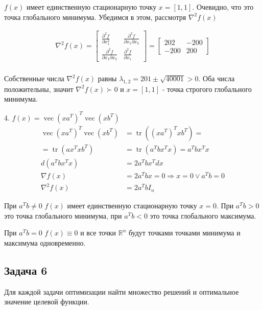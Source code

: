 \documentclass{article}
\DeclareMathOperator{\tr}{tr}
\DeclareMathOperator{\vect}{vec}
\newcommand{\RV}[1] {\mathbb{R}^{#1}}
\begin{document}
    $f(x)$ имеет единственную стационарную точку $x = [1, 1]$. Очевидно, что это точка глобального минимума. Убедимся в этом, рассмотря $\nabla^2 f(x)$
    
    \begin{align*}
        \nabla^2 f(x) = 
                \left[
                \begin{matrix} 
                    \frac{\partial^2 f}{\partial x_1^2} &
                    \frac{\partial^2 f}{\partial x_1 \partial x_2}\\                    
                    \frac{\partial^2 f}{\partial x_1 \partial x_2} &
                    \frac{\partial^2 f}{\partial x_1}
                \end{matrix}
                \right] 
                = 
                \left[
                \begin{matrix} 
                    202 & -200\\
                    -200 & 200
                \end{matrix}
                \right]\\
    \end{align*}
    
    Собственные числа $\nabla^2 f(x)$ равны $\lambda_{1,2} = 201 \pm \sqrt{40001} > 0$. Оба числа положительны, значит $\nabla^2 f(x) \succ 0$ и $x = [1, 1]$ - точка строгого глобального минимума.
    \bigbreak
    
    4. $f(x) = \vect(xa^T)^T\vect(xb^T)$
    \begin{align*}
        \vect(xa^T)^T\vect(xb^T) &= \tr((xa^T)^Txb^T) =\\
        = \tr(ax^Txb^T) &= \tr(a^Tbx^Tx) = a^Tbx^Tx\\
        d(a^Tbx^Tx) &= 2a^Tbx^Tdx\\
        \nabla f(x) &= 2a^Tbx = 0 \Rightarrow x = 0 \vee a^Tb = 0\\ 
        \nabla^2 f(x) &= 2a^TbI_n
    \end{align*}
        
    При $ a^Tb \neq 0$  $f(x)$ имеет единственную стационарную точку $x = 0$. При $a^Tb > 0$ это точка глобального минимума, при $a^Tb < 0$ это точка глобального максимума. 
    
    При $a^Tb = 0 $ $f(x) \equiv 0$ и все точки $\RV{n}$ будут точками точками минимума и максимума одновременно.
    \newpage
    
    \subsection*{Задача 6}
    Для каждой задачи оптимизации найти множество решений и оптимальное значение
 целевой функции.
    \bigbreak
    
\end{document}
